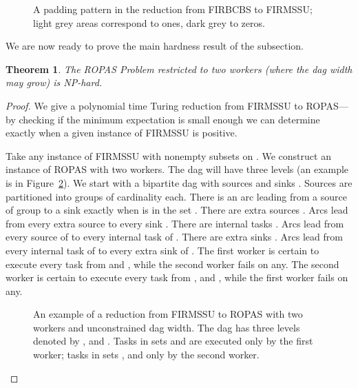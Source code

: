 \documentclass[letterpaper,11pt]{article}
\newtheorem{theorem}{Theorem}[section]
\begin{document}
\begin{figure}[htb]
\centerline{}
\caption{A padding pattern in the reduction from FIRBCBS to FIRMSSU; light grey areas correspond to ones, dark grey to zeros.
\label{f.padding}}
\end{figure}


We are now ready to prove the main hardness result of the subsection.

\begin{theorem}
\label{t.two}
The ROPAS Problem restricted to two workers (where the dag width may grow) is NP-hard.
\end{theorem}

\begin{proof}
We give a polynomial time Turing reduction from FIRMSSU to ROPAS---by checking if the minimum expectation is small enough we can determine exactly when a given instance of FIRMSSU is positive. 

Take any instance of FIRMSSU with  nonempty subsets  on .
We construct an instance of ROPAS with two workers. The dag will have three levels (an example is in Figure~\ref{f.reduction_wide}).
We start with a bipartite dag with  sources  and  sinks . Sources are partitioned into  groups of cardinality  each. There is an arc leading from a source of group  to a sink  exactly when  is in the set . 
There are  extra sources . Arcs lead from every extra source to every sink . 
There are  internal tasks . Arcs lead from every source of  to every internal task of . 
There are  extra sinks . Arcs lead from every internal task of  to every extra sink of . 
The first worker is certain to execute every task from  and , while the second worker fails on any. The second worker is certain to execute every task from ,  and , while the first worker fails on any.

\begin{figure}[htb]
\centerline{}
\caption{An example of a reduction from FIRMSSU to ROPAS with two workers and unconstrained dag width. The dag has three levels denoted by ,  and . Tasks in sets  and  are executed only by the first worker; tasks in sets ,  and  only by the second worker.
\label{f.reduction_wide}}
\end{figure}


\end{proof}
\end{document}

